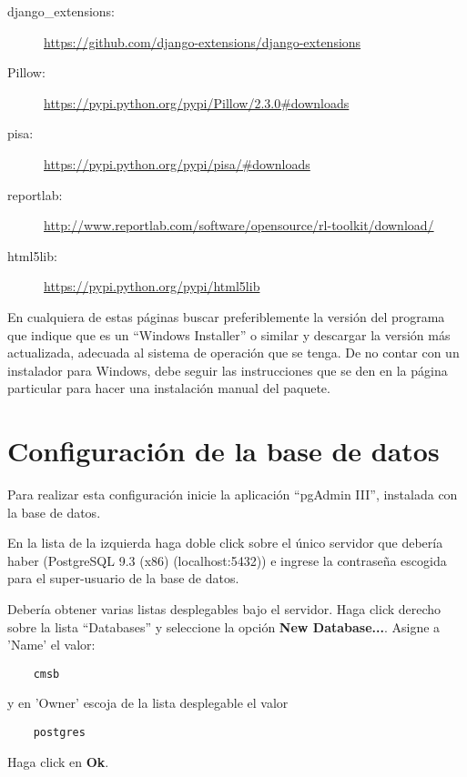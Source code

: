 \documentclass[9pt, letterpaper, oneside]{report}
\begin{document}
    \begin{description}
      \item[django\_extensions:]
        \url{https://github.com/django-extensions/django-extensions}
      \item[Pillow:] \url{https://pypi.python.org/pypi/Pillow/2.3.0#downloads}
      \item[pisa:] \url{https://pypi.python.org/pypi/pisa/#downloads}
      \item[reportlab:]
        \url{http://www.reportlab.com/software/opensource/rl-toolkit/download/}
      \item[html5lib:] \url{https://pypi.python.org/pypi/html5lib}
    \end{description}
      
    En cualquiera de estas páginas buscar preferiblemente la versión del programa
    que indique que es un ``Windows Installer'' o similar y descargar la versión más
    actualizada, adecuada al sistema de operación que se tenga. De no contar con un
    instalador para Windows, debe seguir las instrucciones que se den en la página
    particular para hacer una instalación manual del paquete.

\chapter{Configuración de la base de datos}

  Para realizar esta configuración inicie la aplicación ``pgAdmin III'', instalada
  con la base de datos. 

  En la lista de la izquierda haga doble click sobre el único servidor que
  debería haber (PostgreSQL 9.3 (x86) (localhost:5432)) e ingrese la contraseña
  escogida para el super-usuario de la base de datos.

  Debería obtener varias listas desplegables bajo el servidor. Haga click derecho
  sobre la lista ``Databases'' y seleccione la opción \textbf{New Database...}.
  Asigne a 'Name' el valor:
  
  \begin{verbatim}
    cmsb
  \end{verbatim}
  
  y en 'Owner' escoja de la lista desplegable el valor
  
  \begin{verbatim}
    postgres
  \end{verbatim}
  
  Haga click en \textbf{Ok}.
\end{document}
